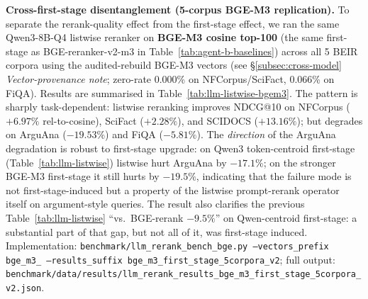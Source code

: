 

\textbf{Cross-first-stage disentanglement (5-corpus BGE-M3 replication).} To separate the rerank-quality effect from the first-stage effect, we ran the same Qwen3-8B-Q4 listwise reranker on \textbf{BGE-M3 cosine top-100} (the same first-stage as BGE-reranker-v2-m3 in Table~\ref{tab:agent-b-baselines}) across all 5 BEIR corpora using the audited-rebuild BGE-M3 vectors (see \S\ref{subsec:cross-model} \textit{Vector-provenance note}; zero-rate 0.000\% on NFCorpus/SciFact, 0.066\% on FiQA). Results are summarised in Table~\ref{tab:llm-listwise-bgem3}. The pattern is sharply task-dependent: listwise reranking improves NDCG@10 on NFCorpus ($+6.97\%$ rel-to-cosine), SciFact ($+2.28\%$), and SCIDOCS ($+13.16\%$); but degrades on ArguAna ($-19.53\%$) and FiQA ($-5.81\%$). The \emph{direction} of the ArguAna degradation is robust to first-stage upgrade: on Qwen3 token-centroid first-stage (Table~\ref{tab:llm-listwise}) listwise hurt ArguAna by $-17.1\%$; on the stronger BGE-M3 first-stage it still hurts by $-19.5\%$, indicating that the failure mode is not first-stage-induced but a property of the listwise prompt-rerank operator itself on argument-style queries. The result also clarifies the previous Table~\ref{tab:llm-listwise} ``vs.\ BGE-rerank $-9.5\%$'' on Qwen-centroid first-stage: a substantial part of that gap, but not all of it, was first-stage induced. Implementation: \texttt{benchmark/llm\_rerank\_bench\_bge.py --vectors\_prefix bge\_m3\_ --results\_suffix bge\_m3\_first\_stage\_5corpora\_v2}; full output: \texttt{benchmark/data/results/llm\_rerank\_results\_bge\_m3\_first\_stage\_5corpora\_v2.json}.

